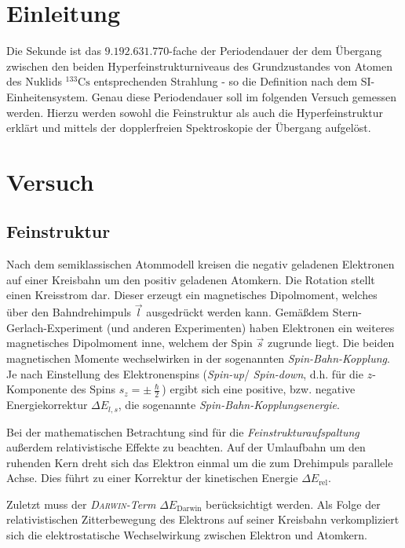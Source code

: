 \documentclass[../bericht.tex]{subfiles}
\begin{document}
  \chapter{Einleitung}

    Die Sekunde ist das $9.192.631.770$-fache der Periodendauer der dem \"Ubergang zwischen den beiden Hyperfeinstrukturniveaus des Grundzustandes von Atomen des Nuklids $\mathrm{^{133}Cs}$ entsprechenden Strahlung - so die Definition nach dem SI-Einheitensystem. Genau diese Periodendauer soll im folgenden Versuch gemessen werden. Hierzu werden sowohl die Feinstruktur als auch die Hyperfeinstruktur erkl\"art und mittels der dopplerfreien Spektroskopie der \"Ubergang aufgel\"ost.


  \chapter{Versuch}

    \section{Feinstruktur}
    \label{sec:feinstruktur}

      Nach dem semiklassischen Atommodell kreisen die negativ geladenen Elektronen auf einer Kreisbahn um den positiv geladenen Atomkern. Die Rotation stellt einen Kreisstrom dar. Dieser erzeugt ein magnetisches Dipolmoment, welches \"uber den Bahndrehimpuls $\vec{l}$ ausgedr\"uckt werden kann. Gem\"a\ss dem Stern-Gerlach-Experiment (und anderen Experimenten) haben Elektronen ein weiteres magnetisches Dipolmoment inne, welchem der Spin $\vec{s}$ zugrunde liegt. Die beiden magnetischen Momente wechselwirken in der sogenannten \textit{Spin-Bahn-Kopplung}. Je nach Einstellung des Elektronenspins (\textit{Spin-up}/ \textit{Spin-down}, d.h. f\"ur die $z$-Komponente des Spins $s_z=\pm \frac{\hslash}{2}$) ergibt sich eine positive, bzw. negative Energiekorrektur $\Delta E_{l,s}$, die sogenannte \textit{Spin-Bahn-Kopplungsenergie}.

      Bei der mathematischen Betrachtung sind f\"ur die \textit{Feinstrukturaufspaltung} au\ss{}erdem relativistische Effekte zu beachten. Auf der Umlaufbahn um den ruhenden Kern dreht sich das Elektron einmal um die zum Drehimpuls parallele Achse. Dies f\"uhrt zu einer Korrektur der kinetischen Energie $\Delta E_\mathrm{rel}$.

      Zuletzt muss der \textit{\textsc{Darwin}-Term} $\Delta E_\mathrm{Darwin}$ ber\"ucksichtigt werden. Als Folge der relativistischen Zitterbewegung des Elektrons auf seiner Kreisbahn verkompliziert sich die elektrostatische Wechselwirkung zwischen Elektron und Atomkern.
      \medskip
\end{document}
